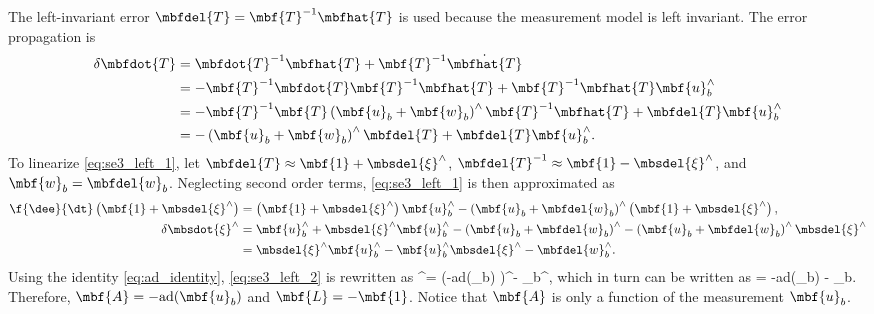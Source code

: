The left-invariant error  $\mbfdel{T} = \mbf{T}^{-1}\mbfhat{T}$ is used because the measurement model is left invariant. The error propagation is 
\begin{align} 
	\delta \mbfdot{T} & = \mbfdot{T}^{-1} \mbfhat{T} + \mbf{T}^{-1}\dot{\mbfhat{T}} \nonumber \\
	& = -\mbf{T}^{-1} \mbfdot{T} \mbf{T}^{-1} \mbfhat{T} + \mbf{T}^{-1} \mbfhat{T} \mbf{u}_b^\wedge \nonumber \\
	& = -\mbf{T}^{-1} \mbf{T} \left(\mbf{u}_b + \mbf{w}_b\right)^\wedge \mbf{T}^{-1} \mbfhat{T} + \mbfdel{T} \mbf{u}_b^\wedge \nonumber \\
	& = -\left(\mbf{u}_b + \mbf{w}_b\right)^\wedge  \mbfdel{T} + \mbfdel{T} \mbf{u}_b^\wedge  \label{eq:se3_left_1}.
\end{align}
To linearize \eqref{eq:se3_left_1}, let $\mbfdel{T} \approx \mbf{1} + \mbsdel{\xi}^\wedge$, $\mbfdel{T}^{-1} \approx \mbf{1} - \mbsdel{\xi}^\wedge$,  and $\mbf{w}_b = \mbfdel{w}_b$. Neglecting second order terms, \eqref{eq:se3_left_1} is then approximated as
\begin{align} 
	\f{\dee}{\dt} \left(\mbf{1} + \mbsdel{\xi}^\wedge\right) & = \left(\mbf{1} + \mbsdel{\xi}^\wedge\right) \mbf{u}_b^\wedge -\left(\mbf{u}_b + \mbfdel{w}_b\right)^\wedge \left(\mbf{1} +\mbsdel{\xi}^\wedge\right), \nonumber \\
	\delta \mbsdot{\xi}^\wedge & = \mbf{u}_b^\wedge + \mbsdel{\xi}^\wedge \mbf{u}_b^\wedge - \left(\mbf{u}_b + \mbfdel{w}_b\right)^\wedge - \left(\mbf{u}_b + \mbfdel{w}_b\right)^\wedge \mbsdel{\xi}^\wedge \nonumber \\
	 & = \mbsdel{\xi}^\wedge \mbf{u}_b^\wedge - \mbf{u}_b^\wedge \mbsdel{\xi}^\wedge -\mbfdel{w}_b^\wedge .  \label{eq:se3_left_2}
\end{align}
Using the identity \eqref{eq:ad_identity}, \eqref{eq:se3_left_2} is rewritten as
\bdis
	\delta \mbsdot{\xi}^\wedge = \left(-\textrm{ad}(_b) \mbsdel{\xi}\right)^\wedge - _b^\wedge,
\edis
which in turn can be written as
\bdis
	\delta \mbsdot{\xi} = -\textrm{ad}(_b) \mbsdel{\xi} - _b.
\edis
Therefore, $\mbf{A} = -\textrm{ad}(\mbf{u}_b)$ and $\mbf{L} = -\mbf{1}$. Notice that $\mbf{A}$ is only a function of the measurement $\mbf{u}_b$.

